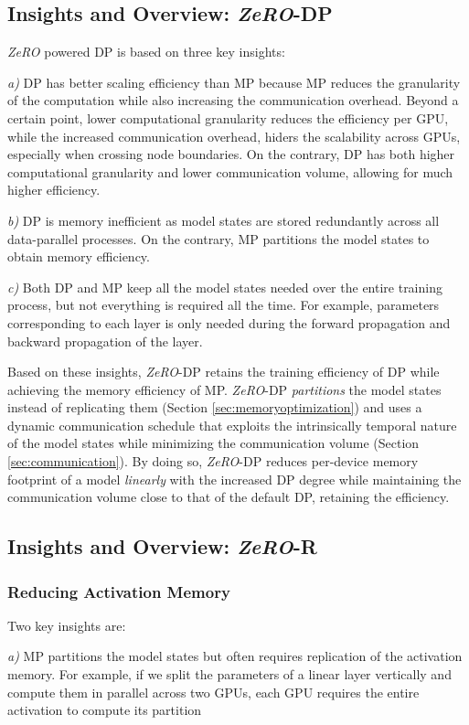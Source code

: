 \documentclass{article}
\newcommand{\name}{\emph{ZeRO}\xspace}
\begin{document}
\subsection{Insights and Overview: \name-DP}
\name powered DP is based on three key insights:

{\it a)} DP has better scaling efficiency than MP because MP reduces the granularity of the computation while also increasing the communication overhead. Beyond a certain point, lower computational granularity reduces the efficiency per GPU, while the increased communication overhead, hiders the scalability across GPUs, especially when crossing node boundaries. On the contrary, DP has both higher computational granularity and lower communication volume, allowing for much higher efficiency.

{\it b)} DP is memory inefficient as model states are stored redundantly across all data-parallel processes. On the contrary, MP partitions the model states to obtain memory efficiency.

{\it c)} Both DP and MP keep all the model states needed over the entire training process, but not everything is required all the time.  For example, parameters corresponding to each layer is only needed during the forward propagation and backward propagation of the layer. 

Based on these insights, \name-DP retains the training efficiency of DP while achieving the memory efficiency of MP. \name-DP \emph{partitions} the model states instead of replicating them (Section \ref{sec:memoryoptimization}) and uses a dynamic communication schedule that exploits the intrinsically temporal nature of the model states while minimizing the communication volume (Section \ref{sec:communication}). By doing so, \name-DP reduces per-device memory footprint of a model \emph{linearly} with the increased DP degree while maintaining the communication volume close to that of the default DP, retaining the efficiency.
\subsection{Insights and Overview: \name-R}
\label{sec:mp_activation_replication}
\subsubsection{Reducing Activation Memory}
Two key insights are:

{\it a)} MP partitions the model states but often requires replication of the activation memory. For example, if we split the parameters of a linear layer vertically and compute them in parallel across two GPUs, each GPU requires the entire activation to compute its partition
\end{document}
